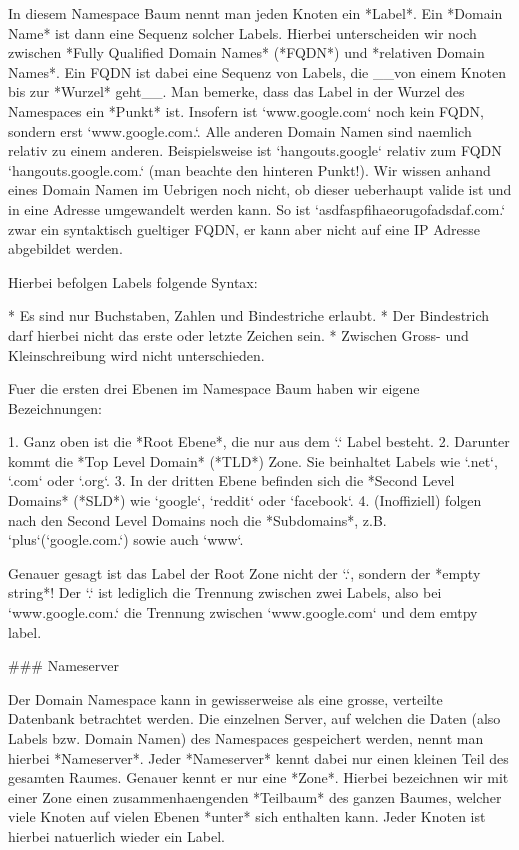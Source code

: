 In diesem Namespace Baum nennt man jeden Knoten ein *Label*. Ein *Domain Name*
ist dann eine Sequenz solcher Labels. Hierbei unterscheiden wir noch zwischen
*Fully Qualified Domain Names* (*FQDN*) und *relativen Domain Names*. Ein FQDN
ist dabei eine Sequenz von Labels, die __von einem Knoten bis zur *Wurzel*
geht__. Man bemerke, dass das Label in der Wurzel des Namespaces ein *Punkt*
ist. Insofern ist `www.google.com` noch kein FQDN, sondern erst
`www.google.com.`. Alle anderen Domain Namen sind naemlich relativ zu einem
anderen. Beispielsweise ist `hangouts.google` relativ zum FQDN
`hangouts.google.com.` (man beachte den hinteren Punkt!). Wir wissen anhand
eines Domain Namen im Uebrigen noch nicht, ob dieser ueberhaupt valide ist und
in eine Adresse umgewandelt werden kann. So ist `asdfaspfihaeorugofadsdaf.com.`
zwar ein syntaktisch gueltiger FQDN, er kann aber nicht auf eine IP Adresse
abgebildet werden.

Hierbei befolgen Labels folgende Syntax:

* Es sind nur Buchstaben, Zahlen und Bindestriche erlaubt.
* Der Bindestrich darf hierbei nicht das erste oder letzte Zeichen sein.
* Zwischen Gross- und Kleinschreibung wird nicht unterschieden.

Fuer die ersten drei Ebenen im Namespace Baum haben wir eigene Bezeichnungen:

1. Ganz oben ist die *Root Ebene*, die nur aus dem `.` Label besteht.
2. Darunter kommt die *Top Level Domain* (*TLD*) Zone. Sie beinhaltet Labels wie
   `.net`, `.com` oder `.org`.
3. In der dritten Ebene befinden sich die *Second Level Domains* (*SLD*) wie
   `google`, `reddit` oder `facebook`.
4. (Inoffiziell) folgen nach den Second Level Domains noch die *Subdomains*,
   z.B. `plus`(`google.com.`) sowie auch `www`.

Genauer gesagt ist das Label der Root Zone nicht der `.`, sondern der *empty
string*! Der `.` ist lediglich die Trennung zwischen zwei Labels, also bei
`www.google.com.` die Trennung zwischen `www.google.com` und dem emtpy label.

### Nameserver

Der Domain Namespace kann in gewisserweise als eine grosse, verteilte Datenbank
betrachtet werden. Die einzelnen Server, auf welchen die Daten (also Labels
bzw. Domain Namen) des Namespaces gespeichert werden, nennt man hierbei
*Nameserver*. Jeder *Nameserver* kennt dabei nur einen kleinen Teil des gesamten
Raumes. Genauer kennt er nur eine *Zone*. Hierbei bezeichnen wir mit einer Zone
einen zusammenhaengenden *Teilbaum* des ganzen Baumes, welcher viele Knoten auf
vielen Ebenen *unter* sich enthalten kann. Jeder Knoten ist hierbei natuerlich
wieder ein Label.

